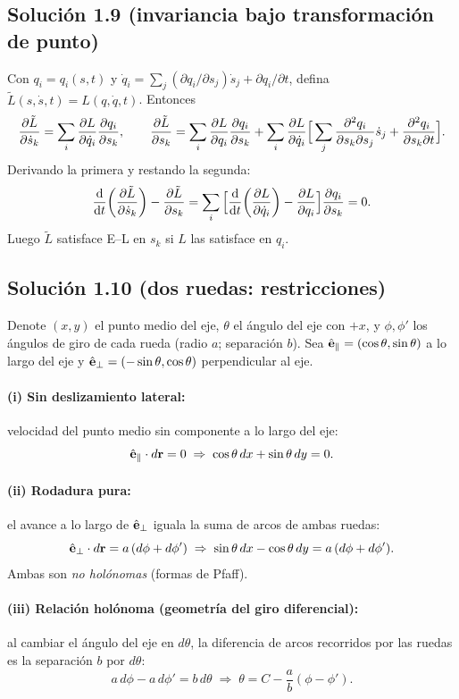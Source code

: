 \subsection*{Solución 1.9 (invariancia bajo transformación de punto)}
Con $q_i=q_i(s,t)$ y
$\dot q_i=\sum_j (\partial q_i/\partial s_j)\dot s_j+\partial q_i/\partial t$,
defina $\tilde L(s,\dot s,t)=L(q,\dot q,t)$. Entonces
\[
\pdv{\tilde L}{\dot s_k}=\sum_i \pdv{L}{\dot q_i}\pdv{q_i}{s_k},\qquad
\pdv{\tilde L}{s_k}=\sum_i \pdv{L}{q_i}\pdv{q_i}{s_k}
+\sum_i \pdv{L}{\dot q_i}\Big[\sum_j \pdv[2]{q_i}{s_k}{s_j}\dot s_j+\pdv[2]{q_i}{s_k}{t}\Big].
\]
Derivando la primera y restando la segunda:
\[
\dv{t}\!\left(\pdv{\tilde L}{\dot s_k}\right)-\pdv{\tilde L}{s_k}
=\sum_i\Big[\dv{t}\!\left(\pdv{L}{\dot q_i}\right)-\pdv{L}{q_i}\Big]\pdv{q_i}{s_k}=0.
\]
Luego $\tilde L$ satisface E–L en $s_k$ si $L$ las satisface en $q_i$.

\subsection*{Solución 1.10 (dos ruedas: restricciones)}
Denote $(x,y)$ el punto medio del eje, $\theta$ el ángulo del eje con $+x$,
y $\phi,\phi'$ los ángulos de giro de cada rueda (radio $a$; separación $b$).
Sea $\hat{\vb e}_\parallel=(\cos\theta,\sin\theta)$ a lo largo del eje y
$\hat{\vb e}_\perp=(-\sin\theta,\cos\theta)$ perpendicular al eje.
\paragraph{(i) Sin deslizamiento lateral:}
velocidad del punto medio sin componente a lo largo del eje:
\[
\hat{\vb e}_\parallel\cdot d\vb r=0
\;\Rightarrow\;
\cos\theta\,dx+\sin\theta\,dy=0.
\]
\paragraph{(ii) Rodadura pura:}
el avance a lo largo de $\hat{\vb e}_\perp$ iguala la suma de arcos de ambas ruedas:
\[
\hat{\vb e}_\perp\cdot d\vb r=a\,(d\phi+d\phi')
\;\Rightarrow\;
\sin\theta\,dx-\cos\theta\,dy=a\,(d\phi+d\phi').
\]
Ambas son \emph{no holónomas} (formas de Pfaff).
\paragraph{(iii) Relación holónoma (geometría del giro diferencial):}
al cambiar el ángulo del eje en $d\theta$, la diferencia de arcos recorridos por las ruedas es
la separación $b$ por $d\theta$:
\[
a\,d\phi-a\,d\phi'=b\,d\theta
\;\Rightarrow\;
\theta=C-\frac{a}{b}(\phi-\phi').
\]
	
